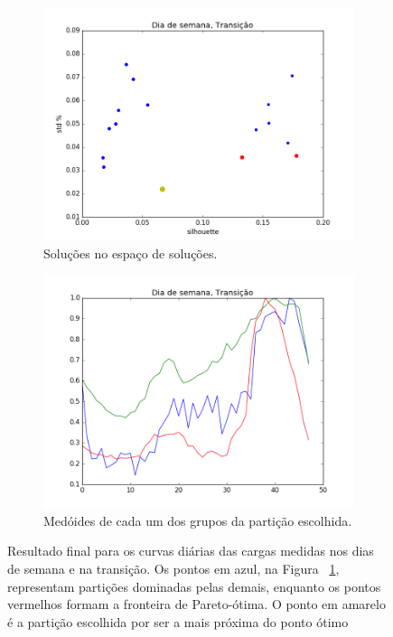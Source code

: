 \begin{figure}
	\centering
	\begin{subfigure}{.5\textwidth}
		\centering
		\includegraphics[width=.9\linewidth]{figuras/australia_5000/pareto_Dia_de_semana_Transicao.png}
		\caption{Soluções no espaço de soluções.}
		\label{fig:pareto_DDS_transicao}
	\end{subfigure}%
	\begin{subfigure}{.5\textwidth}
		\centering
		\includegraphics[width=.9\linewidth]{figuras/australia_5000/Dia_de_semana_Transicao.png}
		\caption{Medóides de cada um dos grupos da partição escolhida.}
		\label{fig:DDS_transicao}
	\end{subfigure}
	\caption{Resultado final para os curvas diárias das cargas medidas nos dias de semana e na transição. Os pontos em azul, na Figura ~\ref{fig:pareto_DDS_transicao}, representam partições dominadas pelas demais, enquanto os pontos vermelhos formam a fronteira de Pareto-ótima. O ponto em amarelo é a partição escolhida por ser a mais próxima do ponto ótimo}
	\label{fig:DDS_transicao_}
\end{figure}

